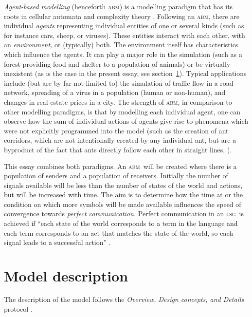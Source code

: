 \documentclass[DIV=calc,BCOR=0mm,pagesize]{scrartcl}
\newcommand{\abm}{\textsc{abm}}
\newcommand{\lsg}{\textsc{lsg}}
\newcommand{\odd}{\textsc{odd}}
\begin{document}
\emph{Agent-based modelling} (henceforth \abm) is a modelling paradigm that has its roots in cellular automata and complexity theory \citep{heath_some_2014}.
Following \citet{grimm_individual_2005,railsback_agent_2011} an \abm, there are individual \emph{agents} representing individual entities of one or several kinds (such as for instance cars, sheep, or viruses).
These entities interact with each other, with an \emph{environment,} or (typically) both.
The environment itself has characteristics which influence the agents.
It can play a major role in the simulation (such as a forest providing food and shelter to a population of animals) or be virtually inexistent (as is the case in the present essay, see section~\ref{sec:mod}).
Typical applications include (but are by far not limited to) the simulation of traffic flow in a road network, spreading of a virus in a population (human or non-human), and changes in real estate prices in a city.
The strength of \abm, in comparison to other modelling paradigms, is that  by modelling each individual agent, one can observe how the sum of individual actions of agents give rise to phenomena which were not explicitly programmed into the model (such as the creation of ant corridors, which are not intentionally created by any individual ant, but are a byproduct of the fact that ants directly follow each other in straight lines, \citet{netlogo modelling library}).

This essay combines both paradigms.
An \abm\ will be created where there is a population of senders and a population of receivers.
Initially the number of signals available will be less than the number of states of the world and actions, but will be increased with time.
The aim is to determine how the time at or the condition on which more symbols will be made available influences the speed of convergence towards \emph{perfect communication.}
Perfect communication in an \lsg\ is achieved if ``each state of the world corresponds to a term in the language and each term corresponds to an act that matches the state of the world, so each signal leads to a successful action'' \citep[p.~530, there referred to as ``perfect Lewis signalling system'']{barrett_dynamic_2007}.


\section{Model description}
\label{sec:mod}
The description of the model follows the \emph{Overview, Design concepts, and Details} protocol \citep[][henceforth \odd]{grimm_standard_2006, grimm_odd_2010}.
\end{document}
